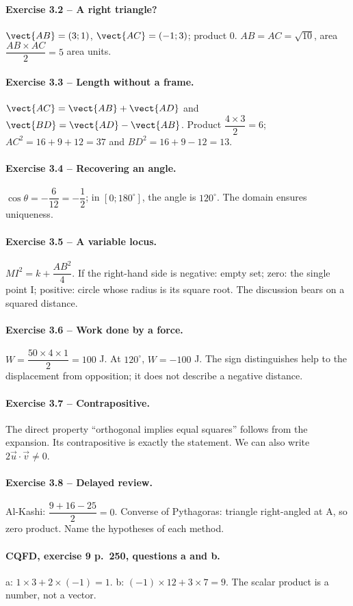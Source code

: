 \paragraph{Exercise 3.2 -- A right triangle?} $\vect{AB}=(3;1)$, $\vect{AC}=(-1;3)$; product 0. $AB=AC=\sqrt{10}$, area $\dfrac{AB\times AC}{2}=5$ area units.
\paragraph{Exercise 3.3 -- Length without a frame.} $\vect{AC}=\vect{AB}+\vect{AD}$ and $\vect{BD}=\vect{AD}-\vect{AB}$. Product $\dfrac{4\times 3}{2}=6$; $AC^2=16+9+12=37$ and $BD^2=16+9-12=13$.
\paragraph{Exercise 3.4 -- Recovering an angle.} $\cos \theta =-\dfrac{6}{12}=-\dfrac{1}{2}$; in $[0;180^\circ]$, the angle is $120^\circ$. The domain ensures uniqueness.
\paragraph{Exercise 3.5 -- A variable locus.} $MI^2=k+\dfrac{AB^2}{4}$. If the right-hand side is negative: empty set; zero: the single point I; positive: circle whose radius is its square root. The discussion bears on a squared distance.
\paragraph{Exercise 3.6 -- Work done by a force.} $W=\dfrac{50\times 4\times 1}{2}=100$ J. At $120^\circ$, $W=-100$ J. The sign distinguishes help to the displacement from opposition; it does not describe a negative distance.
\paragraph{Exercise 3.7 -- Contrapositive.} The direct property ``orthogonal implies equal squares'' follows from the expansion. Its contrapositive is exactly the statement. We can also write $2\vec u\cdot\vec v\ne0$.
\paragraph{Exercise 3.8 -- Delayed review.} Al-Kashi: $\dfrac{9+16-25}{2}=0$. Converse of Pythagoras: triangle right-angled at A, so zero product. Name the hypotheses of each method.
\paragraph{CQFD, exercise 9 p.~250, questions a and b.} a: $1\times3+2\times(-1)=1$. b: $(-1)\times12+3\times7=9$. The scalar product is a number, not a vector.
